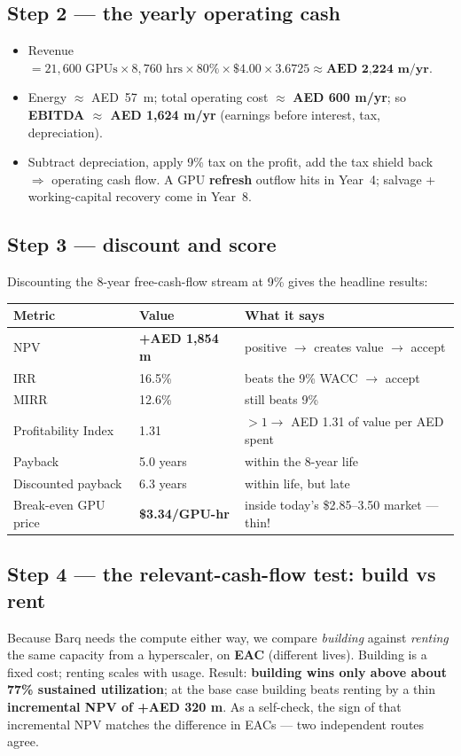 \documentclass[11pt,a4paper]{article}
\newcommand{\term}[1]{\textcolor{tvblue}{\textbf{#1}}}
\begin{document}
\subsection{Step 2 --- the yearly operating cash}
\begin{itemize}
  \item Revenue $=21{,}600\text{ GPUs}\times8{,}760\text{ hrs}\times80\%\times\$4.00\times3.6725
  \approx \textbf{AED 2{,}224 m/yr}$.
  \item Energy $\approx$ AED~57~m; total operating cost $\approx$ \textbf{AED 600 m/yr}; so
  \textbf{EBITDA $\approx$ AED 1{,}624 m/yr} (earnings before interest, tax, depreciation).
  \item Subtract depreciation, apply 9\% tax on the profit, add the tax shield back $\Rightarrow$
  operating cash flow. A GPU \term{refresh} outflow hits in Year~4; salvage + working-capital
  recovery come in Year~8.
\end{itemize}

\subsection{Step 3 --- discount and score}
Discounting the 8-year free-cash-flow stream at 9\% gives the headline results:

\begin{center}
\begin{tabular}{lll}
\toprule
\textbf{Metric} & \textbf{Value} & \textbf{What it says} \\
\midrule
NPV & \textbf{+AED 1{,}854 m} & positive $\rightarrow$ creates value $\rightarrow$ accept \\
IRR & 16.5\% & beats the 9\% WACC $\rightarrow$ accept \\
MIRR & 12.6\% & still beats 9\% \\
Profitability Index & 1.31 & $>1 \rightarrow$ AED 1.31 of value per AED spent \\
Payback & 5.0 years & within the 8-year life \\
Discounted payback & 6.3 years & within life, but late \\
Break-even GPU price & \textbf{\$3.34/GPU-hr} & inside today's \$2.85--3.50 market --- thin! \\
\bottomrule
\end{tabular}
\end{center}

\subsection{Step 4 --- the relevant-cash-flow test: build vs rent}
Because Barq needs the compute either way, we compare \emph{building} against \emph{renting} the same
capacity from a hyperscaler, on \term{EAC} (different lives). Building is a fixed cost; renting scales
with usage. Result: \textbf{building wins only above about 77\% sustained utilization}; at the base
case building beats renting by a thin \textbf{incremental NPV of +AED 320 m}. As a self-check, the
sign of that incremental NPV matches the difference in EACs --- two independent routes agree.
\end{document}
